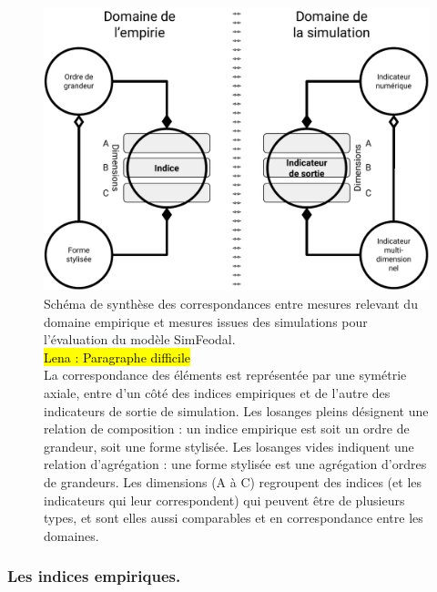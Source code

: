\begin{figure}[H]
\includegraphics[width=\linewidth]{img/schema_indice_indicateur.pdf}
\caption[Schéma de synthèse des correspondances entre mesures relevant du domaine empirique et mesures issues des simulations pour l'évaluation du modèle SimFeodal]{Schéma de synthèse des correspondances entre mesures relevant du domaine empirique et mesures issues des simulations pour l'évaluation du modèle SimFeodal.\\
\hl{Lena : Paragraphe difficile}\\
La correspondance des éléments est représentée par une symétrie axiale, entre d'un côté des \og indices empiriques\fg{} et de l'autre des \og indicateurs de sortie de simulation\fg{}.
Les losanges pleins désignent une relation de composition :
un \og indice empirique\fg{} est soit un ordre de grandeur, soit une forme stylisée.
Les losanges vides indiquent une relation d'agrégation :
une forme stylisée est une agrégation d'ordres de grandeurs.
Les dimensions (A à C) regroupent des indices (et les indicateurs qui leur correspondent) qui peuvent être de plusieurs types, et sont elles aussi comparables et en correspondance entre les domaines.
}
\label{fig:schema_indices}
\end{figure}


\subsubsection{Les indices empiriques.}

